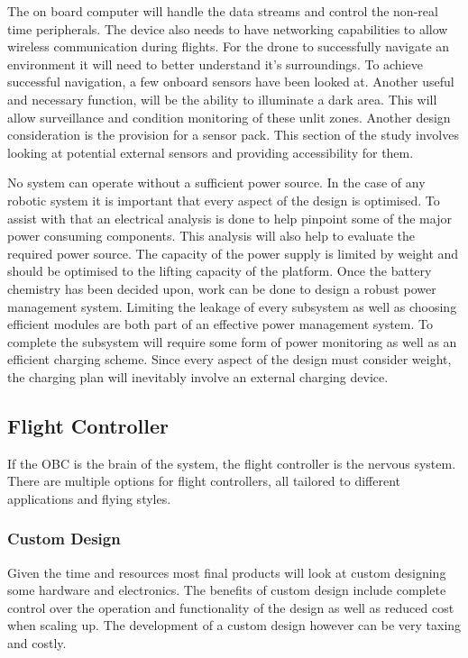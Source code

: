 	The on board computer will handle the data streams and control the non-real time peripherals. The device also needs to have networking capabilities to allow wireless communication during flights. For the drone to successfully navigate an environment it will need to better understand it's surroundings. To achieve successful navigation, a few onboard sensors have been looked at. Another useful and necessary function, will be the ability to illuminate a dark area. This will allow surveillance and condition monitoring of these unlit zones. Another design consideration is the provision for a sensor pack. This section of the study involves looking at potential external sensors and providing accessibility for them.
	
	No system can operate without a sufficient power source. In the case of any robotic system it is important that every aspect of the design is optimised. To assist with that an electrical analysis is done to help pinpoint some of the major power consuming components. This analysis will also help to evaluate the required power source. The capacity of the power supply is limited by weight and should be optimised to the lifting capacity of the platform. Once the battery chemistry has been decided upon, work can be done to design a robust power management system. Limiting the leakage of every subsystem as well as choosing efficient modules are both part of an effective power management system. To complete the subsystem will require some form of power monitoring as well as an efficient charging scheme. Since every aspect of the design must consider weight, the charging plan will inevitably involve an external charging device.
	
		\subsection{Flight Controller}
		If the	OBC is the brain of the system, the flight controller is the nervous system. There are multiple options for flight controllers, all tailored to different applications and flying styles.
		
			\subsubsection{Custom Design}
			Given the time and resources most final products will look at custom designing some hardware and electronics. The benefits of custom design include complete control over the operation and functionality of the design as well as reduced cost when scaling up. The development of a custom design however can be very taxing and costly.
			
